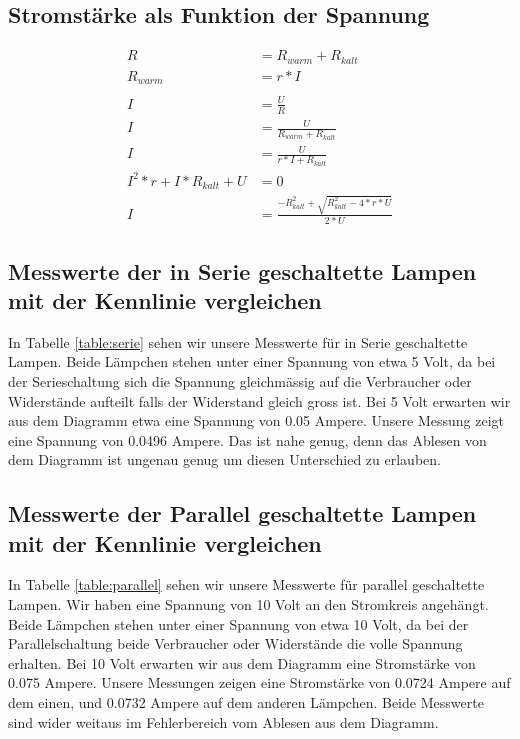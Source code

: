 \documentclass[12pt, a4paper, twoside]{article}
\begin{document}
\subsection{Stromstärke als Funktion der Spannung}
\begin{align*}
  R                      & = R_{warm} + R_{kalt}                             \\
  R_{warm}               & = r * I                                           \\
  \\
  I                      & = \frac{U}{R}                                     \\
  I                      & = \frac{U}{R_{warm} + R_{kalt}}                   \\
  I                      & = \frac{U}{r * I + R_{kalt}}                      \\
  I^2*r + I*R_{kalt} + U & = 0                                               \\
  I                      & = \frac{-R_{kalt}^2+\sqrt{R_{kalt}^2-4*r*U}}{2*U}
\end{align*}


\subsection{Messwerte der in Serie geschaltette Lampen mit der Kennlinie vergleichen}
In Tabelle \ref{table:serie} sehen wir unsere Messwerte für in Serie geschaltette Lampen.
Beide Lämpchen stehen unter einer Spannung von etwa 5 Volt, da bei der Serieschaltung sich die Spannung gleichmässig auf die Verbraucher oder Widerstände aufteilt falls der Widerstand gleich gross ist.
Bei 5 Volt erwarten wir aus dem Diagramm etwa eine Spannung von 0.05 Ampere.
Unsere Messung zeigt eine Spannung von 0.0496 Ampere.
Das ist nahe genug, denn das Ablesen von dem Diagramm ist ungenau genug um diesen Unterschied zu erlauben.

\subsection{Messwerte der Parallel geschaltette Lampen mit der Kennlinie vergleichen}
In Tabelle \ref{table:parallel} sehen wir unsere Messwerte für parallel geschaltette Lampen.
Wir haben eine Spannung von 10 Volt an den Stromkreis angehängt.
Beide Lämpchen stehen unter einer Spannung von etwa 10 Volt, da bei der Parallelschaltung beide Verbraucher oder Widerstände die volle Spannung erhalten.
Bei 10 Volt erwarten wir aus dem Diagramm eine Stromstärke von 0.075 Ampere.
Unsere Messungen zeigen eine Stromstärke von 0.0724 Ampere auf dem einen, und 0.0732 Ampere auf dem anderen Lämpchen.
Beide Messwerte sind wider weitaus im Fehlerbereich vom Ablesen aus dem Diagramm.
\end{document}

